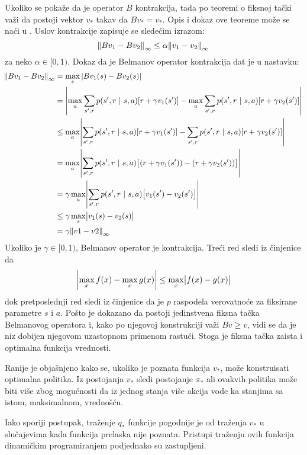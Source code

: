 Ukoliko se pokaže da je operator $B$ kontrakcija, tada po teoremi o fiksnoj tački važi da postoji vektor $v_*$ takav da $Bv_*=v_*$. Opis i dokaz ove teoreme može se naći u \cite{num_met}. Uslov kontrakcije zapisuje se sledećim izrazom:
\begin{equation}
	\norm{Bv_1-Bv_2}_{\infty} \leq \alpha \norm{v_1-v_2}_{\infty}
\end{equation}
za neko $\alpha \in [0, 1)$. 
Dokaz da je Belmanov operator kontrakcija dat je u nastavku:
\begin{align}
	\norm{Bv_1-Bv_2}_{\infty} &= \max_s |Bv_1(s)-Bv_2(s)| \\
	&= \mabs*{\max_{a}\sum_{s', r}^{} p(s', r~|~s,a)[r+\gamma v_1(s')] - \max_{a}\sum_{s', r}^{} p(s', r~|~s,a)[r+\gamma v_2(s')]} \\
	&\leq \max_{a} \mabs*{\sum_{s', r}^{} p(s', r~|~s,a)[r+\gamma v_1(s')] - \sum_{s', r}^{} p(s', r~|~s,a)[r+\gamma v_2(s')]} \\
	&=\max_{a} \mabs*{ \sum_{s', r}^{} p(s', r~|~s,a) \big[(r+\gamma v_1(s'))-(r+\gamma v_2(s'))\big]} \\
	&=\gamma\max_{a} \mabs*{ \sum_{s', r}^{} p(s', r~|~s,a)\big[v_1(s')-v_2(s')\big]} \\
	&\leq \gamma \max_s \mabs*{v_1(s)-v_2(s)} \\
	&= \gamma \norm{v1-v2}_{\infty}
\end{align}
Ukoliko je $\gamma \in [0, 1)$, Belmanov operator je kontrakcija. Treći red sledi iz činjenice da 
\begin{equation}
	\mabs*{\max_{x} f(x) - \max_{x} g(x)} \leq \max_{x}\mabs*{f(x)-g(x)}
\end{equation}
dok pretposlednji red sledi iz činjenice da je $p$ raspodela verovatnoće za fiksirane parametre $s$ i $a$. Pošto je dokazano da postoji jedinstvena fiksna tačka Belmanovog operatora i, kako po njegovoj konstrukciji važi $Bv \geq v$, vidi se da je niz dobijen njegovom uzastopnom primenom rastući. Stoga je fiksna tačka zaista i optimalna funkcija vrednosti.
\par 
Ranije je objašnjeno kako se, ukoliko je poznata funkcija $v_*$, može konstruisati optimalna politika. Iz postojanja $v_*$ sledi postojanje $\pi_*$ ali ovakvih politika može biti više zbog mogućnosti da iz jednog stanja više akcija vode ka stanjima sa istom, maksimalnom, vrednošću. 
\par 
Iako sporiji postupak, traženje $q_*$ funkcije pogodnije je od traženja $v_*$ u slučajevima kada funkcija prelaska nije poznata. Pristupi traženju ovih funkcija dinamičkim programiranjem podjednako su zastupljeni. 
